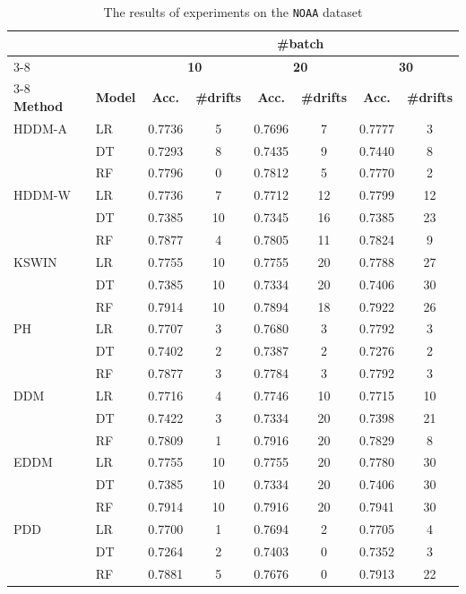 \documentclass[pdflatex,sn-mathphys-ay]{sn-jnl}%
\theoremstyle{thmstyleone}%
\theoremstyle{thmstyletwo}%
\theoremstyle{thmstylethree}%
\begin{document}
\begin{table}[h]
    \centering
    \scriptsize
    \caption{The results of experiments on the \texttt{NOAA} dataset}
    \label{tab:exp_NOAA}
    \begin{tabular}{llcccccc}\toprule
       && \multicolumn{6}{c}{\textbf{\#batch}}\\\cmidrule(lr){3-8}
       && \multicolumn{2}{c}{\textbf{10}} & \multicolumn{2}{c}{\textbf{20}} & \multicolumn{2}{c}{\textbf{30}} \\\cmidrule(lr){3-8}
       \textbf{Method} & \textbf{Model} & \textbf{Acc.} & \textbf{\#drifts} & \textbf{Acc.} & \textbf{\#drifts} & \textbf{Acc.} & \textbf{\#drifts} \\\midrule
       HDDM-A & LR & 0.7736 & 5 & 0.7696 & 7 & 0.7777 & 3 \\
              & DT & 0.7293 & 8 & 0.7435 & 9 & 0.7440 & 8 \\
              & RF & 0.7796 & 0 & 0.7812 & 5 & 0.7770 & 2 \\\midrule
       HDDM-W & LR & 0.7736 & 7 & 0.7712 & 12 & 0.7799 & 12 \\
              & DT & 0.7385 & 10 & 0.7345 & 16 & 0.7385 & 23 \\
              & RF & 0.7877 & 4 & 0.7805 & 11 & 0.7824 & 9 \\\midrule
       KSWIN  & LR & 0.7755 & 10 & 0.7755 & 20 & 0.7788 & 27 \\
              & DT & 0.7385 & 10 & 0.7334 & 20 & 0.7406 & 30 \\
              & RF & 0.7914 & 10 & 0.7894 & 18 & 0.7922 & 26 \\\midrule
       PH & LR & 0.7707 & 3 & 0.7680 & 3 & 0.7792 & 3 \\
                   & DT & 0.7402 & 2 & 0.7387 & 2 & 0.7276 & 2 \\
                   & RF & 0.7877 & 3 & 0.7784 & 3 & 0.7792 & 3 \\\midrule
       DDM    & LR & 0.7716 & 4 & 0.7746 & 10 & 0.7715 & 10 \\
              & DT & 0.7422 & 3 & 0.7334 & 20 & 0.7398 & 21 \\
              & RF & 0.7809 & 1 & 0.7916 & 20 & 0.7829 & 8 \\\midrule
       EDDM   & LR & 0.7755 & 10 & 0.7755 & 20 & 0.7780 & 30 \\
              & DT & 0.7385 & 10 & 0.7334 & 20 & 0.7406 & 30 \\
              & RF & 0.7914 & 10 & 0.7916 & 20 & 0.7941 & 30 \\\midrule
       PDD    & LR & 0.7700 & 1 & 0.7694 & 2 & 0.7705 & 4 \\
              & DT & 0.7264 & 2 & 0.7403 & 0 & 0.7352 & 3 \\
              & RF & 0.7881 & 5 & 0.7676 & 0 & 0.7913 & 22 \\\bottomrule
    \end{tabular}
\end{table}
\end{document}
